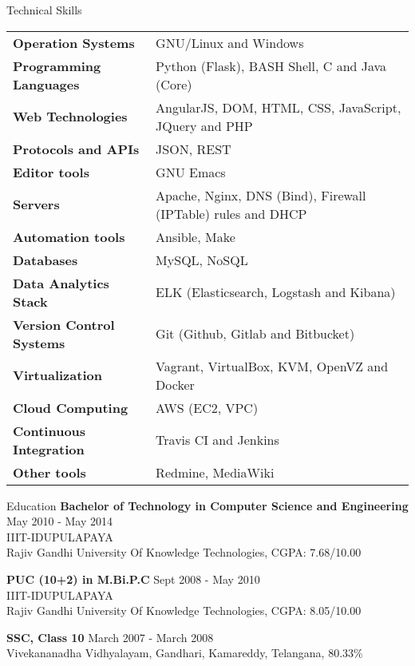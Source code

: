 \documentclass{resume} %
\begin{document}
\begin{rSection}
  {Technical Skills}

  \begin{tabular}{ @{} >{\bfseries}l @{\hspace{2ex}} l }
    Operation Systems & GNU/Linux and Windows \\
    Programming Languages & Python (Flask), BASH Shell, C and Java (Core)
    \\ Web Technologies & AngularJS, DOM, HTML, CSS,
    JavaScript, JQuery and PHP\\ Protocols and
    APIs & JSON, REST \\ Editor tools & GNU Emacs \\ Servers
    & Apache, Nginx, DNS (Bind), Firewall (IPTable) rules
    and DHCP \\ Automation tools & Ansible, Make
    \\ Databases & MySQL, NoSQL \\ Data Analytics Stack &
    ELK (Elasticsearch, Logstash and Kibana) \\
    Version Control Systems & Git (Github, Gitlab and
    Bitbucket) \\ Virtualization & Vagrant, VirtualBox, KVM,
    OpenVZ and Docker \\ Cloud Computing & AWS (EC2, VPC)
    \\ Continuous Integration & Travis CI and Jenkins \\ Other
    tools & Redmine, MediaWiki
    
  \end{tabular}

\end{rSection}



\begin{rSection}{Education}
  {\bf Bachelor of Technology in Computer Science and Engineering} \hfill {May 2010 - May 2014}
  \\ 
  IIIT-IDUPULAPAYA
  \\
  Rajiv Gandhi University Of Knowledge Technologies,  CGPA: 7.68/10.00  
  
  {\bf PUC (10+2) in M.Bi.P.C} \hfill {Sept 2008 - May 2010}
  \\
  IIIT-IDUPULAPAYA
  \\
  Rajiv Gandhi University Of Knowledge Technologies,  CGPA: 8.05/10.00  
  
  {\textbf{SSC, Class 10}}  \hfill March 2007 - March  2008 \\
  Vivekananadha Vidhyalayam, Gandhari, Kamareddy, Telangana, 80.33\% 

\end{rSection}
\end{document}
